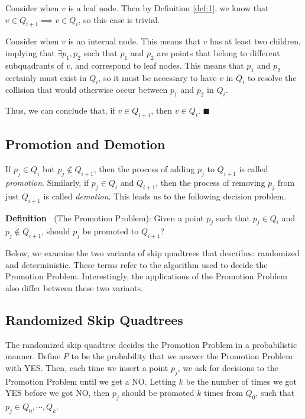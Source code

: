\documentclass[12pt]{article}
\newcounter{defn}
\newcommand{\defn}[0]{\textbf{Definition \refstepcounter{defn}\thedefn\label{def:\thedefn}}}
\begin{document}
        Consider when $v$ is a leaf node. Then by Definition \ref{def:1}, we know that $v \in Q_{i+1} \implies v \in Q_i$, so this case is trivial.
        
        Consider when $v$ is an internal node. This means that $v$ has at least two children, implying that $\exists p_1, p_2$ such that $p_1$ and $p_2$ are points that belong to different subquadrants of $v$, and correspond to leaf nodes. This means that $p_1$ and $p_2$ certainly must exist in $Q_i$, so it must be necessary to have $v$ in $Q_i$ to resolve the collision that would otherwise occur between $p_1$ and $p_2$ in $Q_i$.
        
        Thus, we can conclude that, if $v \in Q_{i+1}$, then $v \in Q_i$. \hfill $\blacksquare$
        
    \subsection{Promotion and Demotion}
        
        If $p_j \in Q_i$ but $p_j \not\in Q_{i+1}$, then the process of adding $p_j$ to $Q_{i+1}$ is called \textit{promotion}. Similarly, if $p_j \in Q_i$ and $Q_{i+1}$, then the process of removing $p_j$ from just $Q_{i+1}$ is called \textit{demotion}. This leads us to the following decision problem.
        
        \defn\ (The Promotion Problem): Given a point $p_j$ such that $p_j \in Q_i$ and $p_j \not\in Q_{i+1}$, should $p_j$ be promoted to $Q_{i+1}$?
        
        Below, we examine the two variants of skip quadtrees that \cite{sqt} describes: randomized and deterministic. These terms refer to the algorithm used to decide the Promotion Problem. Interestingly, the applications of the Promotion Problem also differ between these two variants.
    
    \subsection{Randomized Skip Quadtrees}
        The randomized skip quadtree decides the Promotion Problem in a probabilistic manner. Define $P$ to be the probability that we answer the Promotion Problem with YES. Then, each time we insert a point $p_j$, we ask for decisions to the Promotion Problem until we get a NO. Letting $k$ be the number of times we got YES before we got NO, then $p_j$ should be promoted $k$ times from $Q_0$, such that $p_j \in Q_0, \cdots, Q_k$.
        
\end{document}
